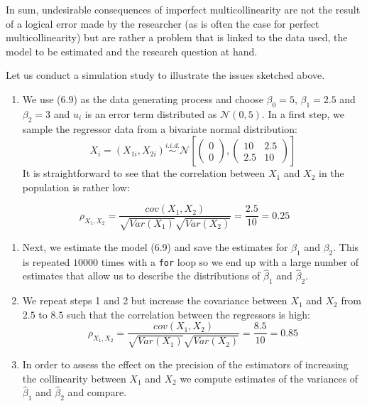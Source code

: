 \documentclass[]{book}
\providecommand{\tightlist}{%
  \setlength{\itemsep}{0pt}\setlength{\parskip}{0pt}}
\theoremstyle{definition}
\theoremstyle{definition}
\theoremstyle{definition}
\theoremstyle{remark}
\begin{document}
In sum, undesirable consequences of imperfect multicollinearity are not
the result of a logical error made by the researcher (as is often the
case for perfect multicollinearity) but are rather a problem that is
linked to the data used, the model to be estimated and the research
question at hand.

Let us conduct a simulation study to illustrate the issues sketched
above.

\begin{enumerate}
\def\labelenumi{\arabic{enumi}.}
\tightlist
\item
  We use (6.9) as the data generating process and choose
  \(\beta_0 = 5\), \(\beta_1 = 2.5\) and \(\beta_2 = 3\) and \(u_i\) is
  an error term distributed as \(\mathcal{N}(0,5)\). In a first step, we
  sample the regressor data from a bivariate normal distribution:
  \[ X_i = (X_{1i}, X_{2i}) \overset{i.i.d.}{\sim} \mathcal{N} \left[\begin{pmatrix} 0 \\ 0  \end{pmatrix}, \begin{pmatrix} 10 & 2.5 \\ 2.5 & 10 \end{pmatrix} \right] \]
  It is straightforward to see that the correlation between \(X_1\) and
  \(X_2\) in the population is rather low:
\end{enumerate}

\[ \rho_{X_1,X_2} = \frac{cov(X_1,X_2)}{\sqrt{Var(X_1)}\sqrt{Var{(X_2)}}} = \frac{2.5}{10} = 0.25 \]

\begin{enumerate}
\def\labelenumi{\arabic{enumi}.}
\setcounter{enumi}{1}
\item
  Next, we estimate the model (6.9) and save the estimates for
  \(\beta_1\) and \(\beta_2\). This is repeated \(10000\) times with a
  \texttt{for} loop so we end up with a large number of estimates that
  allow us to describe the distributions of \(\hat\beta_1\) and
  \(\hat\beta_2\).
\item
  We repeat steps 1 and 2 but increase the covariance between \(X_1\)
  and \(X_2\) from \(2.5\) to \(8.5\) such that the correlation between
  the regressors is high:
  \[ \rho_{X_1,X_2} = \frac{cov(X_1,X_2)}{\sqrt{Var(X_1)}\sqrt{Var{(X_2)}}} = \frac{8.5}{10} = 0.85 \]
\item
  In order to assess the effect on the precision of the estimators of
  increasing the collinearity between \(X_1\) and \(X_2\) we compute
  estimates of the variances of \(\hat\beta_1\) and \(\hat\beta_2\) and
  compare.
\end{enumerate}
\end{document}
